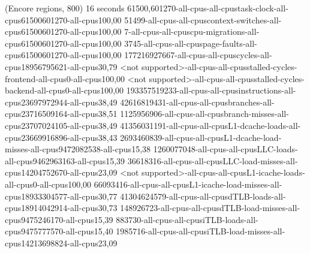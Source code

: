 (Encore regions, 800)
16 seconds
61500,601270-all-cpus-all-cpustask-clock-all-cpus61500601270-all-cpus100,00
51499-all-cpus-all-cpuscontext-switches-all-cpus61500601270-all-cpus100,00
7-all-cpus-all-cpuscpu-migrations-all-cpus61500601270-all-cpus100,00
3745-all-cpus-all-cpuspage-faults-all-cpus61500601270-all-cpus100,00
177216927667-all-cpus-all-cpuscycles-all-cpus18956795621-all-cpus30,79
<not supported>-all-cpus-all-cpusstalled-cycles-frontend-all-cpus0-all-cpus100,00
<not supported>-all-cpus-all-cpusstalled-cycles-backend-all-cpus0-all-cpus100,00
193357519233-all-cpus-all-cpusinstructions-all-cpus23697972944-all-cpus38,49
42616819431-all-cpus-all-cpusbranches-all-cpus23716509164-all-cpus38,51
1125956906-all-cpus-all-cpusbranch-misses-all-cpus23707024105-all-cpus38,49
41356031191-all-cpus-all-cpusL1-dcache-loads-all-cpus23669916896-all-cpus38,43
2693460839-all-cpus-all-cpusL1-dcache-load-misses-all-cpus9472082538-all-cpus15,38
1260077048-all-cpus-all-cpusLLC-loads-all-cpus9462963163-all-cpus15,39
36618316-all-cpus-all-cpusLLC-load-misses-all-cpus14204752670-all-cpus23,09
<not supported>-all-cpus-all-cpusL1-icache-loads-all-cpus0-all-cpus100,00
66093416-all-cpus-all-cpusL1-icache-load-misses-all-cpus18933304577-all-cpus30,77
41304624579-all-cpus-all-cpusdTLB-loads-all-cpus18914042914-all-cpus30,73
148926723-all-cpus-all-cpusdTLB-load-misses-all-cpus9475246170-all-cpus15,39
883730-all-cpus-all-cpusiTLB-loads-all-cpus9475777570-all-cpus15,40
1985716-all-cpus-all-cpusiTLB-load-misses-all-cpus14213698824-all-cpus23,09
